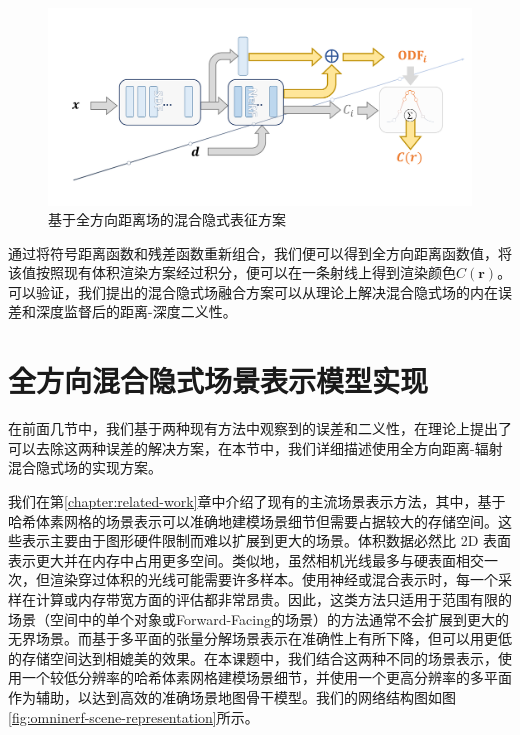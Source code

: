 \begin{figure}[ht]
    \centering
    \includegraphics[width=\textwidth]{undergraduate-thesis/images/omni-nerf/omninerf-model.pdf}
    \caption{基于全方向距离场的混合隐式表征方案}
    \label{fig:omninerf-model}
\end{figure}

通过将符号距离函数和残差函数重新组合，我们便可以得到全方向距离函数值，将该值按照现有体积渲染方案经过积分，便可以在一条射线上得到渲染颜色$C(\mathbf{r})$。 可以验证，我们提出的混合隐式场融合方案可以从理论上解决混合隐式场的内在误差和深度监督后的距离-深度二义性。

\section{全方向混合隐式场景表示模型实现}
在前面几节中，我们基于两种现有方法中观察到的误差和二义性，在理论上提出了可以去除这两种误差的解决方案，在本节中，我们详细描述使用全方向距离-辐射混合隐式场的实现方案。

我们在第\ref{chapter:related-work}章中介绍了现有的主流场景表示方法，其中，基于哈希体素网格的场景表示可以准确地建模场景细节但需要占据较大的存储空间。这些表示主要由于图形硬件限制而难以扩展到更大的场景。体积数据必然比 2D 表面表示更大并在内存中占用更多空间。类似地，虽然相机光线最多与硬表面相交一次，但渲染穿过体积的光线可能需要许多样本。使用神经或混合表示时，每一个采样在计算或内存带宽方面的评估都非常昂贵。因此，这类方法只适用于范围有限的场景（空间中的单个对象或Forward-Facing的场景）的方法通常不会扩展到更大的无界场景。而基于多平面的张量分解场景表示在准确性上有所下降，但可以用更低的存储空间达到相媲美的效果。在本课题中，我们结合这两种不同的场景表示，使用一个较低分辨率的哈希体素网格建模场景细节，并使用一个更高分辨率的多平面作为辅助，以达到高效的准确场景地图骨干模型。我们的网络结构图如图\ref{fig:omninerf-scene-representation}所示。

